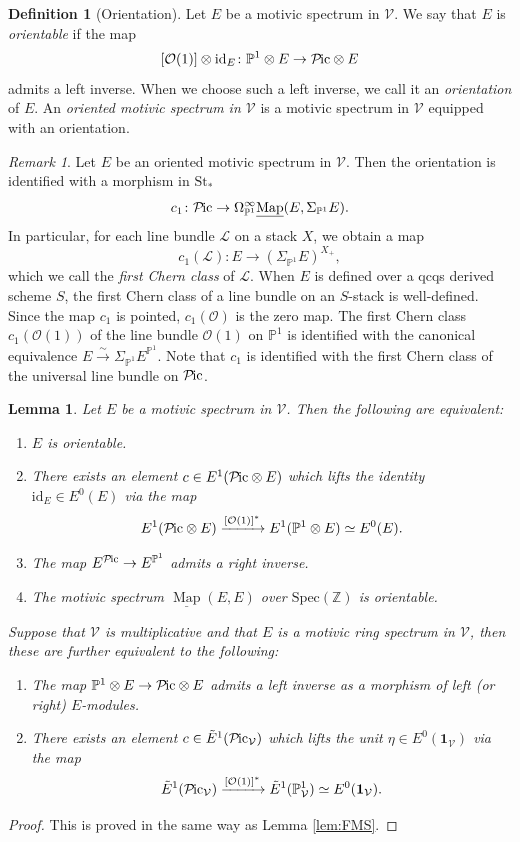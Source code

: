 \documentclass{amsart}
\theoremstyle{plain}
\newtheorem{lemma}[theorem]{Lemma}
\theoremstyle{definition}
\newtheorem{definition}[theorem]{Definition}
\theoremstyle{remark}
\newtheorem{remark}[theorem]{Remark}
\numberwithin{equation}{theorem}
\newcommand{\mcal}[1]{\mathcal{#1}}
\newcommand{\mbb}[1]{\mathbb{#1}}
\newcommand{\mbf}[1]{\mathbf{#1}}
\newcommand{\Spec}{\mathrm{Spec}}
\newcommand{\St}{\mathrm{St}}
\newcommand{\V}{\mathcal{V}}
\newcommand{\id}{\mathrm{id}}
\newcommand{\OmegaP}{\Omega_{\mathbb{P}^1}}
\newcommand{\SigmaP}{\Sigma_{\mathbb{P}^1}}
\newcommand{\Pic}{{\mathcal{P}\mspace{-2.0mu}\mathrm{ic}}}
\newcommand{\Map}{\operatorname{Map}}
\newcommand{\intMap}{\underline{\Map}}
\begin{document}
\begin{definition}[Orientation]\label{def:Ori}
Let $E$ be a motivic spectrum in $\V$.
We say that $E$ is \textit{orientable} if the map
\[
	[\mcal{O}(1)]\otimes\id_E \colon \mbb{P}^1\otimes E \to \Pic\otimes E
\]
admits a left inverse.
When we choose such a left inverse, we call it an \textit{orientation} of $E$.
An \textit{oriented motivic spectrum in $\V$} is a motivic spectrum in $\V$ equipped with an orientation.
\end{definition}

\begin{remark}
Let $E$ be an oriented motivic spectrum in $\V$.
Then the orientation is identified with a morphism in $\St_*$
\[
	c_1 \colon \Pic \to \OmegaP^\infty \intMap(E,\SigmaP E).
\]
In particular, for each line bundle $\mcal{L}$ on a stack $X$, we obtain a map
\[
	c_1(\mcal{L}) \colon E \to (\SigmaP E)^{X_+},
\]
which we call the \textit{first Chern class} of $\mcal{L}$.
When $E$ is defined over a qcqs derived scheme $S$, the first Chern class of a line bundle on an $S$-stack is well-defined.
Since the map $c_1$ is pointed, $c_1(\mcal{O})$ is the zero map.
The first Chern class $c_1(\mcal{O}(1))$ of the line bundle $\mcal{O}(1)$ on $\mbb{P}^1$ is identified with the canonical equivalence $E\xrightarrow{\sim}\SigmaP E^{\mbb{P}^1}$.
Note that $c_1$ is identified with the first Chern class of the universal line bundle on $\Pic$.
\end{remark}

\begin{lemma}\label{lem:Ori}
Let $E$ be a motivic spectrum in $\V$.
Then the following are equivalent:
\begin{enumerate}
\item $E$ is orientable.
\item There exists an element $c\in E^1(\Pic\otimes E)$ which lifts the identity $\id_E\in E^0(E)$ via the map
\[
	E^1(\Pic\otimes E) \xrightarrow{[\mcal{O}(1)]^*} E^1(\mbb{P}^1\otimes E) \simeq E^0(E).
\]
\item The map $E^\Pic\to E^{\mbb{P}^1}$ admits a right inverse.
\item The motivic spectrum $\intMap(E,E)$ over $\Spec(\mbb{Z})$ is orientable.
\end{enumerate}
Suppose that $\V$ is multiplicative and that $E$ is a motivic ring spectrum in $\V$, then these are further equivalent to the following:
\begin{enumerate}[resume]
\item The map $\mbb{P}^1\otimes E\to\Pic\otimes E$ admits a left inverse as a morphism of left (or right) $E$-modules.
\item There exists an element $c\in\tilde{E}^1(\Pic_\V)$ which lifts the unit $\eta\in E^0(\mbf{1}_\V)$ via the map
\[
	\tilde{E}^1(\Pic_\V) \xrightarrow{[\mcal{O}(1)]^*} \tilde{E}^1(\mbb{P}^1_\V) \simeq E^0(\mbf{1}_\V).
\]
\end{enumerate}
\end{lemma}
\begin{proof}
This is proved in the same way as Lemma \ref{lem:FMS}.
\end{proof}
\end{document}
